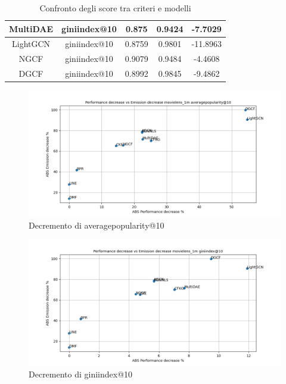 \begin{table}[H]
{\begin{tabular}{|c|c|c|c|c|}
            \hline
            MultiDAE & giniindex@10 & 0.875 & 0.9424 & -7.7029\\
            \hline
            LightGCN & giniindex@10 & 0.8759 & 0.9801 & -11.8963\\
            \hline
            NGCF & giniindex@10 & 0.9079 & 0.9484 & -4.4608\\
            \hline
            DGCF & giniindex@10 & 0.8992 & 0.9845 & -9.4862\\
            \hline
        \end{tabular}
    }
    \caption{Confronto degli score tra criteri e modelli}
\end{table}

\begin{figure}[H]
    \centering
    \includegraphics[scale=0.5]{images/decrement_averagepopularity@10_movielens_1m.png}
    \caption{Decremento di averagepopularity@10}
\end{figure}

\begin{figure}[H]
    \centering
    \includegraphics[scale=0.5]{images/decrement_giniindex@10_movielens_1m.png}
    \caption{Decremento di giniindex@10}
\end{figure}

